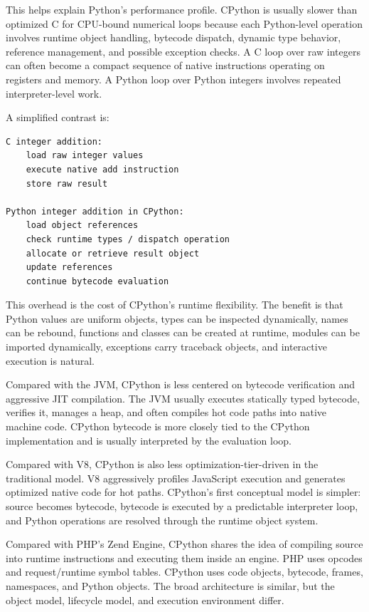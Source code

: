 This helps explain Python's performance profile. CPython is usually slower than optimized C for CPU-bound numerical loops because each Python-level operation involves runtime object handling, bytecode dispatch, dynamic type behavior, reference management, and possible exception checks. A C loop over raw integers can often become a compact sequence of native instructions operating on registers and memory. A Python loop over Python integers involves repeated interpreter-level work.

A simplified contrast is:

\begin{verbatim}
C integer addition:
    load raw integer values
    execute native add instruction
    store raw result

Python integer addition in CPython:
    load object references
    check runtime types / dispatch operation
    allocate or retrieve result object
    update references
    continue bytecode evaluation
\end{verbatim}

This overhead is the cost of CPython's runtime flexibility. The benefit is that Python values are uniform objects, types can be inspected dynamically, names can be rebound, functions and classes can be created at runtime, modules can be imported dynamically, exceptions carry traceback objects, and interactive execution is natural.

Compared with the JVM, CPython is less centered on bytecode verification and aggressive JIT compilation. The JVM usually executes statically typed bytecode, verifies it, manages a heap, and often compiles hot code paths into native machine code. CPython bytecode is more closely tied to the CPython implementation and is usually interpreted by the evaluation loop.

Compared with V8, CPython is also less optimization-tier-driven in the traditional model. V8 aggressively profiles JavaScript execution and generates optimized native code for hot paths. CPython's first conceptual model is simpler: source becomes bytecode, bytecode is executed by a predictable interpreter loop, and Python operations are resolved through the runtime object system.

Compared with PHP's Zend Engine, CPython shares the idea of compiling source into runtime instructions and executing them inside an engine. PHP uses opcodes and request/runtime symbol tables. CPython uses code objects, bytecode, frames, namespaces, and Python objects. The broad architecture is similar, but the object model, lifecycle model, and execution environment differ.

